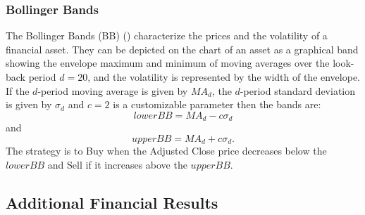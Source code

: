 \documentclass[12pt, a4paper]{article}
\begin{document}
\subsubsection{Bollinger Bands}
The Bollinger Bands (BB) (\cite{bollinger2002bollinger}) characterize the prices and the volatility of a financial asset. They can be depicted on the chart of an asset as a graphical band showing the envelope maximum and minimum of moving averages over the look- back period $d=20$, and the volatility is represented by the width of the envelope.
If the $d$-period moving average is given by $MA_d$, the $d$-period standard deviation is given by $\sigma_d$ and $c=2$ is a customizable parameter then the bands are:
\begin{equation}
    \label{eq:BBlow}
    lowerBB = MA_d - c \sigma_d
\end{equation}
and
\begin{equation}
    \label{eq:BBup}
    upperBB = MA_d + c \sigma_d.
\end{equation}
The strategy is to Buy when the Adjusted Close price decreases below the $lowerBB$ and Sell if it increases above the $upperBB$.

\subsection{Additional Financial Results}
\end{document}
